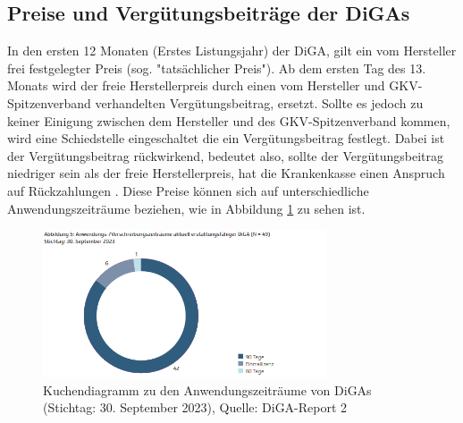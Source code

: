 \documentclass{article}
\begin{document}
		\subsection{Preise und Vergütungsbeiträge der DiGAs}  
			In den ersten 12 Monaten (Erstes Listungsjahr) der DiGA, gilt ein vom Hersteller frei festgelegter Preis (sog. "tatsächlicher Preis"). Ab dem ersten Tag des 13. Monats wird der freie Herstellerpreis durch einen vom Hersteller und GKV-Spitzenverband verhandelten Vergütungsbeitrag, ersetzt. Sollte es jedoch zu keiner Einigung zwischen dem Hersteller und des GKV-Spitzenverband kommen, wird eine Schiedstelle eingeschaltet die ein Vergütungsbeitrag festlegt. Dabei ist der Vergütungsbeitrag rückwirkend, bedeutet also, sollte der Vergütungsbeitrag niedriger sein als der freie Herstellerpreis, hat die Krankenkasse einen Anspruch auf Rückzahlungen \cite[vgl. S. 11]{TK-Report-2}. Diese Preise können sich auf unterschiedliche Anwendungszeiträume beziehen, wie in Abbildung \ref{Abb-andwendungszeiträume-diga} zu sehen ist. 
			\begin{figure}[hbtp]
				\centering
				\includegraphics[width=0.75\textwidth]{./grafiken/anwendungszeitraume_diga}
				\caption[Anwendungszeiträume von DiGAs]{Kuchendiagramm zu den Anwendungszeiträume von DiGAs (Stichtag: 30. September 2023), Quelle: DiGA-Report 2 \cite{TK-Report-2}}
				\label{Abb-andwendungszeiträume-diga}
			\end{figure}
\end{document}
